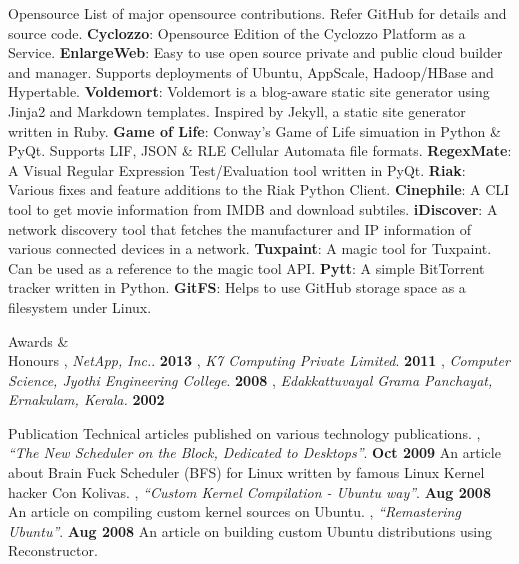 \documentclass{resume}
\begin{document}
\begin{category}{Opensource}
  \citemnobullet List of major opensource contributions. Refer GitHub for details and source code.
  \citembullet \textbf{Cyclozzo}: Opensource Edition of the Cyclozzo Platform as a Service.
  \citembullet \textbf{EnlargeWeb}: Easy to use open source private and public cloud builder and manager. 
  Supports deployments of Ubuntu, AppScale, Hadoop/HBase and Hypertable.
  \citembullet \textbf{Voldemort}: Voldemort is a blog-aware static site generator using Jinja2 
  and Markdown templates. Inspired by Jekyll, a static site generator written in Ruby.
  \citembullet \textbf{Game of Life}: Conway's Game of Life simuation in Python \& PyQt. Supports LIF, JSON \&
  RLE Cellular Automata file formats.
  \citembullet \textbf{RegexMate}: A Visual Regular Expression Test/Evaluation tool written in PyQt.
  \citembullet \textbf{Riak}: Various fixes and feature additions to
  the Riak Python Client.
  \citembullet \textbf{Cinephile}: A CLI tool to get
  movie information from IMDB and download subtiles.
  \citembullet \textbf{iDiscover}: A network discovery tool that fetches the manufacturer and IP information
  of various connected devices in a network.
  \citembullet \textbf{Tuxpaint}: A magic tool for Tuxpaint. Can be used as a reference to the magic tool API.
  \citembullet \textbf{Pytt}: A simple BitTorrent tracker written in Python.
  \citembullet \textbf{GitFS}: Helps to use GitHub storage space as a filesystem under Linux.
\end{category}


\begin{category}{Awards \&\\ Honours}
  , {\em NetApp, Inc.}. \hfill \textbf{2013}
  , {\em K7 Computing Private Limited}. \hfill \textbf{2011}
  , {\em Computer Science, Jyothi Engineering College}. \hfill \textbf{2008}
  , {\em Edakkattuvayal Grama Panchayat, Ernakulam, Kerala.} \hfill \textbf{2002}
\end{category}


\begin{category}{Publication}
  \citemnobullet Technical articles published on various technology publications.
  , {\em ``The New Scheduler on the Block, Dedicated to Desktops''}. \hfill \textbf{Oct 2009}
  \citemnobullet An article about Brain Fuck Scheduler (BFS) for Linux written by famous Linux Kernel hacker Con Kolivas.
  , {\em ``Custom Kernel Compilation - Ubuntu way''}. \hfill \textbf{Aug 2008}
  \citemnobullet An article on compiling custom kernel sources on Ubuntu.
  , {\em ``Remastering Ubuntu''}. \hfill \textbf{Aug 2008}
  \citemnobullet An article on building custom Ubuntu distributions using Reconstructor.
\end{category}
\end{document}
